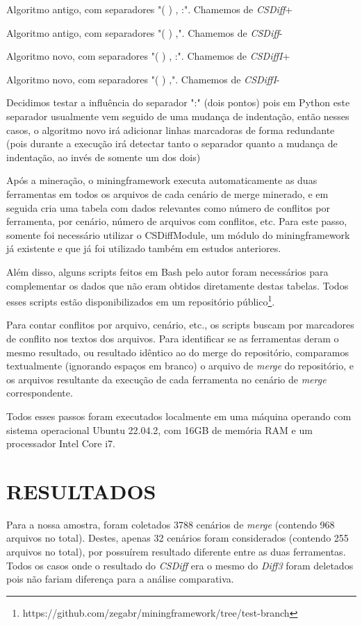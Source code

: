 \begin{compactenum}[(1)]
	\item Algoritmo antigo, com separadores "( ) , :". Chamemos de \emph{CSDiff}+
	\item Algoritmo antigo, com separadores "( ) ,". Chamemos de \emph{CSDiff}-
	\item Algoritmo novo, com separadores "( ) , :". Chamemos de \emph{CSDiffI}+
	\item Algoritmo novo, com separadores "( ) ,". Chamemos de \emph{CSDiffI}-
\end{compactenum}

Decidimos testar a influência do separador ":" (dois pontos) pois em Python este separador usualmente vem seguido de uma
mudança de indentação, então nesses casos, o algoritmo novo irá adicionar linhas marcadoras de forma redundante (pois
durante a execução irá detectar tanto o separador quanto a mudança de indentação, ao invés de somente um dos dois)

Após a mineração, o miningframework executa automaticamente as duas ferramentas em todos os arquivos de cada cenário de merge
minerado, e em seguida cria uma tabela com dados relevantes como número de conflitos por
ferramenta, por cenário, número de arquivos com conflitos, etc. Para este passo, somente foi necessário utilizar
o CSDiffModule, um módulo do miningframework já existente e que já foi utilizado também em estudos anteriores.

Além disso, alguns scripts feitos em Bash pelo autor foram necessários para complementar os dados que não eram obtidos
diretamente destas tabelas. Todos esses scripts estão disponibilizados em um repositório público\footnote{https://github.com/zegabr/miningframework/tree/test-branch}. %

Para contar conflitos por arquivo,
cenário, etc., os scripts buscam por marcadores
de conflito nos textos dos arquivos. Para identificar se as ferramentas deram o mesmo resultado,
ou resultado idêntico ao do merge
do repositório, comparamos textualmente (ignorando espaços em
branco) o arquivo de \emph{merge} do repositório, e os arquivos resultante da execução de cada
ferramenta no cenário de \emph{merge} correspondente.

Todos esses passos foram executados localmente em uma máquina operando com sistema operacional Ubuntu 22.04.2,
com 16GB de memória
RAM e um processador Intel Core i7.

\section{RESULTADOS}
Para a nossa amostra, foram coletados 3788 cenários de \emph{merge} (contendo 968 arquivos
no total). Destes, apenas 32 cenários foram considerados (contendo 255 arquivos no total), por possuírem resultado
diferente entre as duas ferramentas. Todos os casos onde o resultado do \emph{CSDiff} era o mesmo do \emph{Diff3}
foram deletados pois não fariam
diferença para a análise comparativa.

